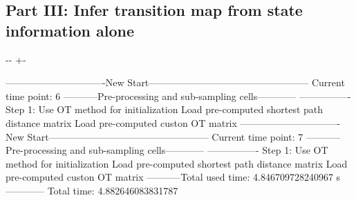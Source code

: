 \documentclass[letterpaper,10pt,english]{sphinxmanual}
\newlength\nbsphinxcodecellspacing
\begin{document}
\subsection{Part III: Infer transition map from state information alone}
\label{\detokenize{20210121_reprogramming_data_merge_tags:Part-III:-Infer-transition-map-from-state-information-alone}}
{
\begin{sphinxVerbatim}[commandchars=\\\{\}]
\llap{\color{nbsphinxin}[37]:\,\hspace{\fboxrule}\hspace{\fboxsep}}\PYG{p}{[}\PYG{p}{]}

\end{sphinxVerbatim}
}

{

\kern-\sphinxverbatimsmallskipamount\kern-\baselineskip
\kern+\FrameHeightAdjust\kern-\fboxrule
\vspace{\nbsphinxcodecellspacing}

\begin{sphinxVerbatim}[commandchars=\\\{\}]
-------------------------------New Start--------------------------------------------------
Current time point: 6
-----------Pre-processing and sub-sampling cells------------
----------------
Step 1: Use OT method for initialization
Load pre-computed shortest path distance matrix
Load pre-computed custon OT matrix
-------------------------------New Start--------------------------------------------------
Current time point: 7
-----------Pre-processing and sub-sampling cells------------
----------------
Step 1: Use OT method for initialization
Load pre-computed shortest path distance matrix
Load pre-computed custon OT matrix
-----------Total used time: 4.846709728240967 s ------------
Total time: 4.882646083831787
\end{sphinxVerbatim}
}
\end{document}
